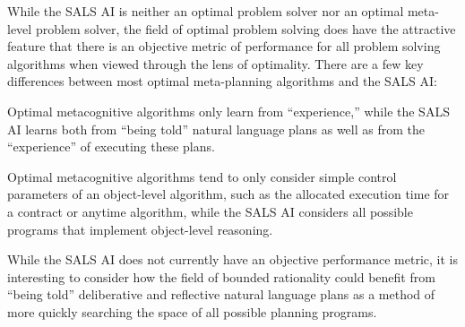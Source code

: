 While the SALS AI is neither an optimal problem solver nor an optimal
meta-level problem solver, the field of optimal problem solving does
have the attractive feature that there is an objective metric of
performance for all problem solving algorithms when viewed through the
lens of optimality.  There are a few key differences between most
optimal meta-planning algorithms and the SALS AI:
\begin{packed_enumerate}
\item{Optimal metacognitive algorithms only learn from ``experience,''
  while the SALS AI learns both from ``being told'' natural language
  plans as well as from the ``experience'' of executing these plans.}
\item{Optimal metacognitive algorithms tend to only consider simple
  control parameters of an object-level algorithm, such as the
  allocated execution time for a contract or anytime algorithm, while
  the SALS AI considers all possible programs that implement
  object-level reasoning.}
\end{packed_enumerate}
While the SALS AI does not currently have an objective performance
metric, it is interesting to consider how the field of bounded
rationality could benefit from ``being told'' deliberative and
reflective natural language plans as a method of more quickly
searching the space of all possible planning programs.






